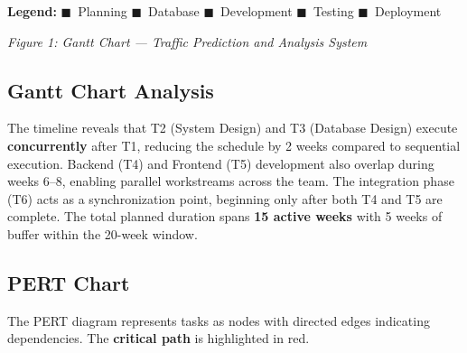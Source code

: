 \documentclass[12pt,a4paper]{article}
\begin{document}
\medskip
\noindent\textbf{Legend:}
\textcolor{phaseA}{$\blacksquare$}~Planning \quad
\textcolor{phaseB}{$\blacksquare$}~Database \quad
\textcolor{phaseC}{$\blacksquare$}~Development \quad
\textcolor{phaseD}{$\blacksquare$}~Testing \quad
\textcolor{phaseE}{$\blacksquare$}~Deployment

\begin{center}
\small\textit{Figure 1: Gantt Chart --- Traffic Prediction and Analysis System}
\end{center}

\subsection{Gantt Chart Analysis}
The timeline reveals that T2 (System Design) and T3 (Database Design) execute \textbf{concurrently} after T1, reducing the schedule by 2 weeks compared to sequential execution. Backend (T4) and Frontend (T5) development also overlap during weeks 6--8, enabling parallel workstreams across the team. The integration phase (T6) acts as a synchronization point, beginning only after both T4 and T5 are complete. The total planned duration spans \textbf{15 active weeks} with 5 weeks of buffer within the 20-week window.

\subsection{PERT Chart}
The PERT diagram represents tasks as nodes with directed edges indicating dependencies. The \textcolor{critical}{\textbf{critical path}} is highlighted in red.
\end{document}
